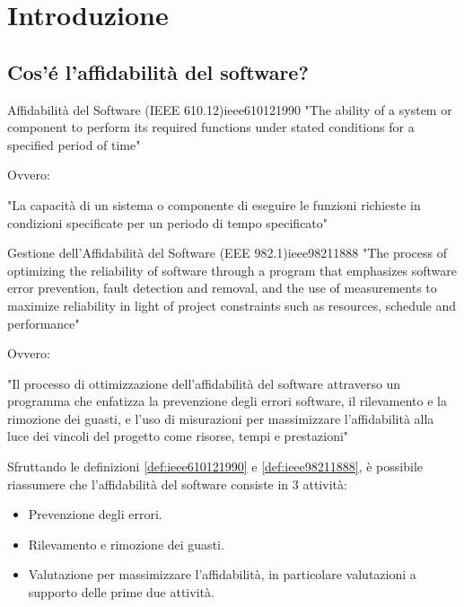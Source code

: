 \section{Introduzione}

\subsection{Cos'é l'affidabilità del software?}

\begin{definizione}{Affidabilità del Software (IEEE 610.12)}{ieee610121990}
"The ability of a system or component to perform its required functions
under stated conditions for a specified period of time"

Ovvero:

"La capacità di un sistema o componente di eseguire le funzioni richieste
in condizioni specificate per un periodo di tempo specificato"
\end{definizione}

\begin{definizione}{Gestione dell'Affidabilità del Software (EEE 982.1)}{ieee98211888}
"The process of optimizing the reliability of software through a program that
emphasizes software error prevention, fault detection and removal, and the
use of measurements to maximize reliability in light of project constraints
such as resources, schedule and performance"

Ovvero:

"Il processo di ottimizzazione dell'affidabilità del software attraverso un
programma che enfatizza la prevenzione degli errori software, il rilevamento
e la rimozione dei guasti, e l'uso di misurazioni per massimizzare l'affidabilità
alla luce dei vincoli del progetto come risorse, tempi e prestazioni"

\end{definizione}

Sfruttando le definizioni \ref{def:ieee610121990} e \ref{def:ieee98211888},
è possibile riassumere che l'affidabilità del software consiste in 3 attività:
\begin{itemize}
    \item Prevenzione degli errori.
    \item Rilevamento e rimozione dei guasti.
    \item Valutazione per massimizzare l'affidabilità, in particolare valutazioni
    a supporto delle prime due attività.
\end{itemize}

